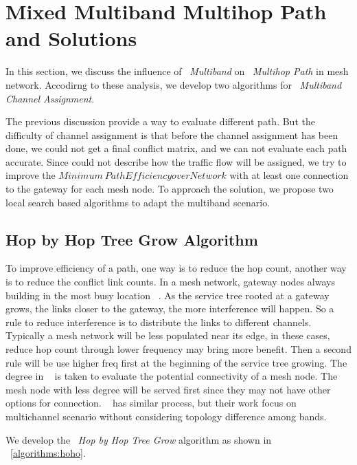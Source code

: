\section{Mixed Multiband Multihop Path and Solutions}
\label{sec:wmalgorithms}


In this section, we discuss the influence of ~\emph{Multiband} on ~\emph{Multihop Path} in mesh network. 
Accodirng to these analysis, we develop two algorithms for ~\emph{Multiband Channel Assignment}.




The previous discussion provide a way to evaluate different path. But the difficulty of channel assignment is that before the channel assignment has been done, we could not get a final conflict matrix, and we can not evaluate each path accurate.
Since could not describe how the traffic flow will be assigned, we try to improve the $Minimum\ Path Efficiency over Network$ with at least one connection to the gateway for each mesh node.
To approach the solution, we propose two local search based algorithms to adapt the multiband scenario. 


\subsection{Hop by Hop Tree Grow Algorithm}
To improve efficiency of a path, one way is to reduce the hop count, another way is to reduce the conflict link counts.
In a mesh network, gateway nodes always building in the most busy location ~\cite{robinson2008adding, he2008optimizing}.
As the service tree rooted at a gateway grows, the links closer to the gateway, the more interference will happen.
So a rule to reduce interference is to distribute the links to different channels. Typically a mesh network will be less populated near its edge, in these cases, reduce hop count through lower frequency may bring more benefit. 
Then a second rule will be use higher freq first at the beginning of the service tree growing. The degree in ~\cite{he2008optimizing} is taken to evaluate the potential connectivity of a mesh node. 
The mesh node with less degree will be served first since they may not have other options for connection.
~\cite{ramachandran2006interference} has similar process, but their work focus on multichannel scenario without considering topology difference among bands.

   We develop the ~\emph{Hop by Hop Tree Grow} algorithm as shown in ~\ref{algorithms:hoho}.


